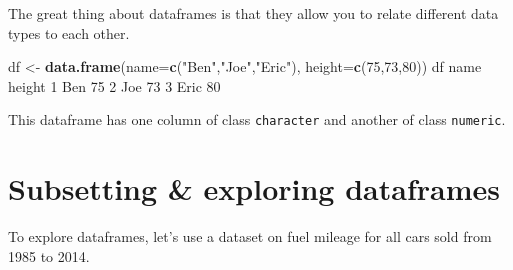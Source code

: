 \documentclass[
]{book}
\newenvironment{Shaded}{\begin{snugshade}}{\end{snugshade}}
\newcommand{\AttributeTok}[1]{\textcolor[rgb]{0.13,0.29,0.53}{#1}}
\newcommand{\DecValTok}[1]{\textcolor[rgb]{0.00,0.00,0.81}{#1}}
\newcommand{\FunctionTok}[1]{\textcolor[rgb]{0.13,0.29,0.53}{\textbf{#1}}}
\newcommand{\NormalTok}[1]{#1}
\newcommand{\OtherTok}[1]{\textcolor[rgb]{0.56,0.35,0.01}{#1}}
\newcommand{\StringTok}[1]{\textcolor[rgb]{0.31,0.60,0.02}{#1}}
\begin{document}
The great thing about dataframes is that they allow you to relate different data types to each other.

\begin{Shaded}
\begin{Highlighting}[]
\NormalTok{df }\OtherTok{\textless{}{-}} \FunctionTok{data.frame}\NormalTok{(}\AttributeTok{name=}\FunctionTok{c}\NormalTok{(}\StringTok{"Ben"}\NormalTok{,}\StringTok{"Joe"}\NormalTok{,}\StringTok{"Eric"}\NormalTok{),}
                 \AttributeTok{height=}\FunctionTok{c}\NormalTok{(}\DecValTok{75}\NormalTok{,}\DecValTok{73}\NormalTok{,}\DecValTok{80}\NormalTok{))}
\NormalTok{df}
\NormalTok{  name height}
\DecValTok{1}\NormalTok{  Ben     }\DecValTok{75}
\DecValTok{2}\NormalTok{  Joe     }\DecValTok{73}
\DecValTok{3}\NormalTok{ Eric     }\DecValTok{80}
\end{Highlighting}
\end{Shaded}

This dataframe has one column of class \texttt{character} and another of class \texttt{numeric}.

\section*{Subsetting \& exploring dataframes}\label{subsetting-exploring-dataframes}

To explore dataframes, let's use a dataset on fuel mileage for all cars sold from 1985 to 2014.
\end{document}
